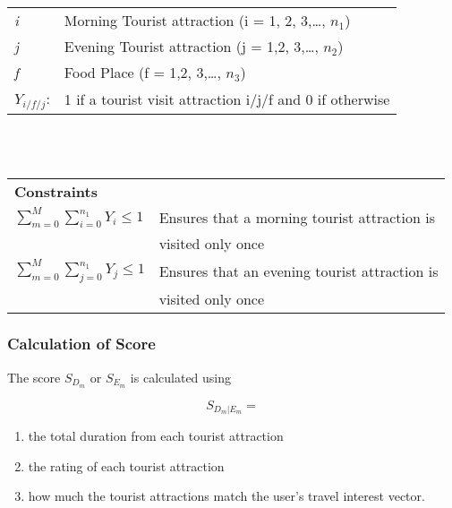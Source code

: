 \documentclass{article} \usepackage[utf8]{inputenc}
\begin{document}
\begin{tabular}{l l}

\textit{i} & Morning Tourist attraction (i = 1, 2, 3,…, $n_1$)\\ \textit{j} &
Evening Tourist attraction (j = 1,2, 3,…, $n_2$)\\ \textit{f} & Food Place (f =
1,2, 3,…, $n_3$)\\ \textit{$Y_{i/f/j}$}: & 1 if a tourist visit attraction
i/j/f and  0 if otherwise\\ \end{tabular} \\ \\ \begin{tabular}{l l}
\textbf{Constraints} & \\ \textit{$ \sum_{m=0}^{M}\sum_{i=0}^{n_1}{Y_i} \leq
1$} & Ensures that a morning tourist attraction is \\ & visited only once\\

\textit{$ \sum_{m=0}^{M}\sum_{j=0}^{n_1}{Y_j} \leq 1$} & Ensures that an
evening tourist attraction is \\ & visited only once\\

\end{tabular}

\subsubsection{Calculation of Score}

The score $S_{D_m}$ or $S_{E_m}$ is calculated using

\[ S_{D_m | E_m} =  \]

\begin{enumerate} \item the total duration from each tourist attraction \item
the rating of each tourist attraction \item how much the tourist attractions
match the user's travel interest vector.  \end{enumerate}
\end{document}
